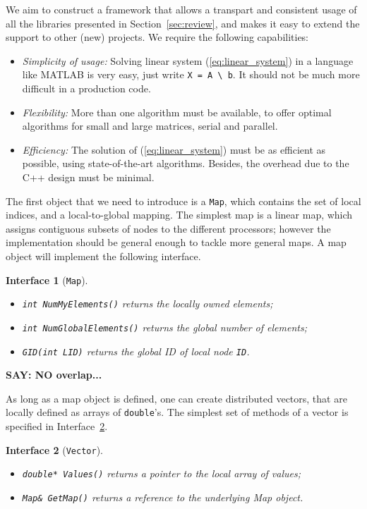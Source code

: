 \documentclass[acmtocl]{acmtrans2m}
\newtheorem{interface}{Interface}[section]
\begin{document}
We aim to construct a framework that allows a transpart and consistent usage
of all the libraries presented in Section~\ref{sec:review}, and makes it easy
to extend the support to other (new) projects. We require the following capabilities:
\begin{itemize}

\item {\sl Simplicity of usage:} Solving linear system (\ref{eq:linear_system}) in a language
like MATLAB is very easy, just write \verb!X = A \ b!. It should not be much
more difficult in a production code.

\item {\sl Flexibility:} More than one algorithm must be available,
  to offer optimal algorithms for small and large matrices, serial and
  parallel.

\item {\sl Efficiency:} The solution of (\ref{eq:linear_system}) must be as
efficient as possible, using state-of-the-art algorithms. Besides, the
overhead due to the C++ design must be minimal.
\end{itemize}

\bigskip

The first object that we need to introduce is a {\tt Map}, which contains the
set of local indices, and a local-to-global mapping. The simplest map is a
linear map, which assigns contiguous subsets of nodes to the different
processors; however the implementation should be general enough to tackle more
general maps. A map object will implement the following interface.

\begin{interface}[{\tt Map}]
\label{int:map}
\begin{itemize}
\item {\tt int NumMyElements()} returns the locally owned elements;
\item {\tt int NumGlobalElements()} returns the global number of elements;
\item {\tt GID(int LID)} returns the global ID of local node {\tt ID}.
\end{itemize}
\end{interface}

{\bf SAY: NO overlap...}

As long as a map object is defined, one can create distributed vectors, that
are locally defined as arrays of {\tt double}'s. The simplest set of methods
of a vector is specified in Interface~\ref{int:vector}.

\begin{interface}[{\tt Vector}]
\label{int:vector}
\begin{itemize}
\item {\tt double* Values()} returns a pointer to the local array of values;
\item {\tt Map\& GetMap()} returns a reference to the underlying Map object.
\end{itemize}
\end{interface}
\end{document}
